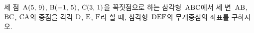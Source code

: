 세 점~$\mathrm{A}(5,\mkern3mu 9)$, $\mathrm{B}(-1,\mkern3mu 5)$, $\mathrm{C}(3,\mkern3mu 1)$을 꼭짓점으로 하는 삼각형~$\mathrm{ABC}$에서 세 변~$\mathrm{AB}$, $\mathrm{BC}$, $\mathrm{CA}$의 중점을 각각 $\mathrm{D}$, $\mathrm{E}$, $\mathrm{F}$라 할 때, 삼각형~$\mathrm{DEF}$의 무게중심의 좌표를 구하시오.
